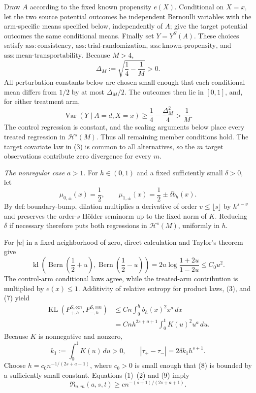 Draw \(A\) according to the fixed known propensity \(e(X)\).  Conditional on \(X=x\), let the two source potential outcomes be independent Bernoulli variables with the arm-specific means specified below, independently of \(A\); give the target potential outcomes the same conditional means.  Finally set \(Y=Y^S(A)\).  These choices satisfy \(\mathrm{ass:consistency}\), \(\mathrm{ass:trial\text{-}randomization}\), \(\mathrm{ass:known\text{-}propensity}\), and \(\mathrm{ass:mean\text{-}transportability}\).  Because \(M>4\),
\[
 \Delta_M:=\sqrt{\frac14-\frac1M}>0.
\]
All perturbation constants below are chosen small enough that each conditional mean differs from \(1/2\) by at most \(\Delta_M/2\).  The outcomes then lie in \([0,1]\), and, for either treatment arm,
\[
 \operatorname{Var}(Y\mid A=d,X=x)
 \ge \frac14-\frac{\Delta_M^2}{4}
 >\frac1M.
\tag{5}
\]
The control regression is constant, and the scaling arguments below place every treated regression in \(\mathcal H^s(M)\).  Thus all remaining member conditions hold.  The target covariate law in (3) is common to all alternatives, so the \(m\) target observations contribute zero divergence for every \(m\).

\emph{The nonregular case \(a>1\).}
For \(h\in(0,1)\) and a fixed sufficiently small \(\delta>0\), let
\[
 \mu_{0,\pm}(x)=\frac12,
 \qquad
 \mu_{1,\pm}(x)=\frac12\pm\delta b_h(x).
\tag{6}
\]
By \(\mathrm{def:boundary\text{-}bump}\), dilation multiplies a derivative of order \(v\le\lfloor s\rfloor\) by \(h^{s-v}\) and preserves the order-\(s\) H\"older seminorm up to the fixed norm of \(K\).  Reducing \(\delta\) if necessary therefore puts both regressions in \(\mathcal H^s(M)\), uniformly in \(h\).

For \(|u|\) in a fixed neighborhood of zero, direct calculation and Taylor's theorem give
\[
 \operatorname{kl}\!\left(
  \operatorname{Bern}\left(\frac12+u\right),
  \operatorname{Bern}\left(\frac12-u\right)
 \right)
 =2u\log\frac{1+2u}{1-2u}
 \le C_0u^2.
\tag{7}
\]
The control-arm conditional laws agree, while the treated-arm contribution is multiplied by \(e(x)\le1\).  Additivity of relative entropy for product laws, (3), and (7) yield
\[
 \begin{aligned}
 \operatorname{KL}(P_{+,h}^{S,\otimes n},P_{-,h}^{S,\otimes n})
 &\le Cn\int_0^h b_h(x)^2x^a\,dx\\
 &=Cnh^{2s+a+1}\int_0^1K(u)^2u^a\,du.
 \end{aligned}
\tag{8}
\]
Because \(K\) is nonnegative and nonzero,
\[
 k_1:=\int_0^1K(u)\,du>0,
 \qquad
 |\tau_+-\tau_-|=2\delta k_1h^{s+1}.
\tag{9}
\]
Choose \(h=c_0n^{-1/(2s+a+1)}\), where \(c_0>0\) is small enough that (8) is bounded by a sufficiently small constant.  Equations (1)--(2) and (9) imply
\[
 \mathfrak R_{n,m}(a,s,t)
 \ge c n^{-(s+1)/(2s+a+1)}.
\tag{10}
\]

